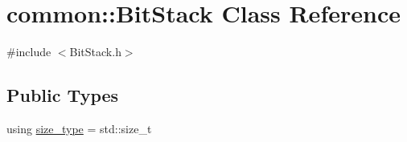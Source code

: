 \hypertarget{classcommon_1_1BitStack}{}\section{common\+:\+:Bit\+Stack Class Reference}
\label{classcommon_1_1BitStack}


{\ttfamily \#include $<$Bit\+Stack.\+h$>$}

\subsection*{Public Types}
\begin{DoxyCompactItemize}
\item 
using \hyperlink{classcommon_1_1BitStack_a058742dc4b8474a7896e6ce27878f306}{size\+\_\+type} = std\+::size\+\_\+t
\end{DoxyCompactItemize}
